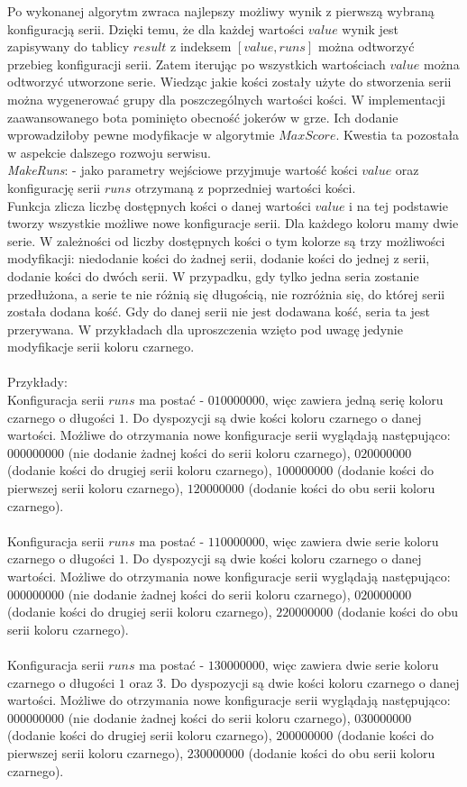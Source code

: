 Po wykonanej algorytm zwraca najlepszy możliwy wynik z pierwszą wybraną konfiguracją serii. Dzięki temu, że dla każdej wartości $value$ wynik jest zapisywany do tablicy $result$ z indeksem $[value, runs]$ można odtworzyć przebieg konfiguracji serii. Zatem iterując po wszystkich wartościach $value$ można odtworzyć utworzone serie. Wiedząc jakie kości zostały użyte do stworzenia serii można wygenerować grupy dla poszczególnych wartości kości. W implementacji zaawansowanego bota pominięto obecność jokerów w grze. Ich dodanie wprowadziłoby pewne modyfikacje w algorytmie $MaxScore$. Kwestia ta pozostała w aspekcie dalszego rozwoju serwisu. \\

\emph{MakeRuns}: - jako parametry wejściowe przyjmuje wartość kości $value$ oraz konfigurację serii $runs$ otrzymaną z poprzedniej wartości kości. \\
Funkcja zlicza liczbę dostępnych kości o danej wartości $value$ i na tej podstawie tworzy wszystkie możliwe nowe konfiguracje serii. Dla każdego koloru mamy dwie serie. W zależności od liczby dostępnych kości o tym kolorze są trzy możliwości modyfikacji: niedodanie kości do żadnej serii, dodanie kości do jednej z serii, dodanie kości do dwóch serii. W przypadku, gdy tylko jedna seria zostanie przedłużona, a serie te nie różnią się długością, nie rozróżnia się, do której serii została dodana kość. Gdy do danej serii nie jest dodawana kość, seria ta jest przerywana. W przykładach dla uproszczenia wzięto pod uwagę jedynie modyfikacje serii koloru czarnego. \\ \\
Przykłady: \\
Konfiguracja serii $runs$  ma postać - $010000000$, więc zawiera jedną serię koloru czarnego o długości $1$. Do dyspozycji są dwie kości koloru czarnego o danej wartości. Możliwe do otrzymania nowe konfiguracje serii wyglądają następująco: $000000000$ (nie dodanie żadnej kości do serii koloru czarnego), $020000000$ (dodanie kości do drugiej serii koloru czarnego), $100000000$ (dodanie kości do pierwszej serii koloru czarnego), $120000000$ (dodanie kości do obu serii koloru czarnego). \\ \\
Konfiguracja serii $runs$  ma postać - $110000000$, więc zawiera dwie serie koloru czarnego o długości $1$. Do dyspozycji są dwie kości koloru czarnego o danej wartości. Możliwe do otrzymania nowe konfiguracje serii wyglądają następująco: $000000000$ (nie dodanie żadnej kości do serii koloru czarnego), $020000000$ (dodanie kości do drugiej serii koloru czarnego), $220000000$ (dodanie kości do obu serii koloru czarnego). \\ \\
Konfiguracja serii $runs$  ma postać - $130000000$, więc zawiera dwie serie koloru czarnego o długości $1$ oraz $3$. Do dyspozycji są dwie kości koloru czarnego o danej wartości. Możliwe do otrzymania nowe konfiguracje serii wyglądają następująco: $000000000$ (nie dodanie żadnej kości do serii koloru czarnego), $030000000$ (dodanie kości do drugiej serii koloru czarnego), $200000000$ (dodanie kości do pierwszej serii koloru czarnego), $230000000$ (dodanie kości do obu serii koloru czarnego). \\


